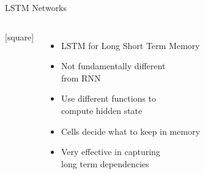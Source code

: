 \begin{frame}{LSTM Networks}
    \begin{columns}
        [square]
        \begin{itemize}
            \item{LSTM for Long Short Term Memory}
            \vspace{0.2cm}
            \item{Not fundamentally different\\from RNN}
            \vspace{0.2cm}
            \item{Use different functions to\\compute hidden state}
            \vspace{0.2cm}
            \item{Cells decide what to keep in memory}
            \vspace{0.2cm}
            \item{Very effective in capturing\\long term dependencies}
        \end{itemize}
        \begin{figure}
            \label{fig:rnn-vs-lstm}
        \end{figure}
    \end{columns}
\end{frame}